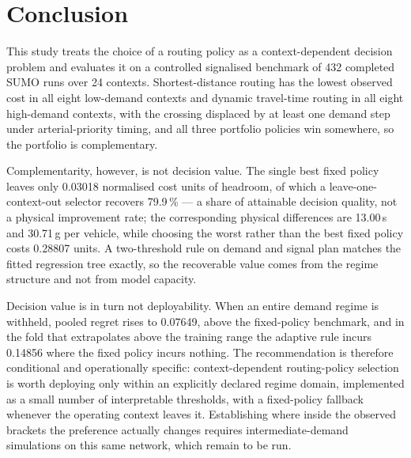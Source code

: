 \section{Conclusion}

This study treats the choice of a routing policy as a context-dependent decision problem
and evaluates it on a controlled signalised benchmark of 432 completed SUMO runs over 24
contexts. Shortest-distance routing has the lowest observed cost in all eight low-demand
contexts and dynamic travel-time routing in all eight high-demand contexts, with the
crossing displaced by at least one demand step under arterial-priority timing, and all
three portfolio policies win somewhere, so the portfolio is complementary.

Complementarity, however, is not decision value. The single best fixed policy leaves only
0.03018 normalised cost units of headroom, of which a leave-one-context-out selector
recovers 79.9\,\% --- a share of attainable decision quality, not a physical improvement
rate; the corresponding physical differences are 13.00\,s and 30.71\,g per vehicle, while
choosing the worst rather than the best fixed policy costs 0.28807 units. A two-threshold
rule on demand and signal plan matches the fitted regression tree exactly, so the
recoverable value comes from the regime structure and not from model capacity.

Decision value is in turn not deployability. When an entire demand regime is withheld,
pooled regret rises to 0.07649, above the fixed-policy benchmark, and in the fold that
extrapolates above the training range the adaptive rule incurs 0.14856 where the fixed
policy incurs nothing. The recommendation is therefore conditional and operationally
specific: context-dependent routing-policy selection is worth deploying only within an
explicitly declared regime domain, implemented as a small number of interpretable
thresholds, with a fixed-policy fallback whenever the operating context leaves it.
Establishing where inside the observed brackets the preference actually changes requires
intermediate-demand simulations on this same network, which remain to be run.





